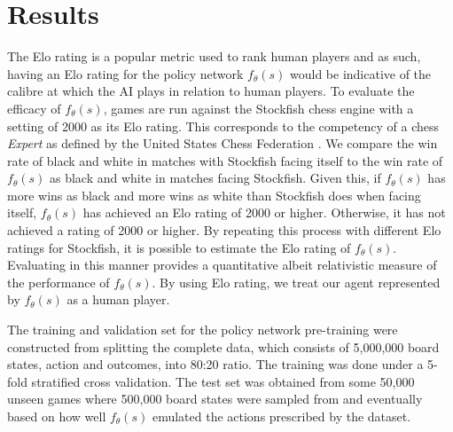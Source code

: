 \documentclass[letterpaper]{article} %
\begin{document}
\section{Results}

%
%
%
%

The Elo rating is a popular metric used to rank human players and as such, having an Elo rating for the policy network $f_\theta(s)$ would be indicative of the calibre at which the AI plays in relation to human players. To evaluate the efficacy of $f_\theta(s)$, games are run against the Stockfish chess engine with a setting of 2000 as its Elo rating. This corresponds to the competency of a chess \textit{Expert} as defined by the United States Chess Federation \cite{just2003united}. We compare the win rate of black and white in matches with Stockfish facing itself to the win rate of $f_\theta(s)$ as black and white in matches facing Stockfish. Given this, if $f_\theta(s)$ has more wins as black and more wins as white than Stockfish does when facing itself, $f_\theta(s)$ has achieved an Elo rating of 2000 or higher. Otherwise, it has not achieved a rating of 2000 or higher. By repeating this process with different Elo ratings for Stockfish, it is possible to estimate the Elo rating of $f_\theta(s)$. Evaluating in this manner provides a quantitative albeit relativistic measure of the performance of $f_\theta(s)$. By using Elo rating, we treat our agent represented by $f_\theta(s)$ as a human player.


The training and validation set for the policy network pre-training were constructed from splitting the complete data, which consists of 5,000,000 board states, action and outcomes, into 80:20 ratio. The training was done under a 5-fold stratified cross validation. The test set was obtained from some 50,000 unseen games where 500,000 board states were sampled from and eventually based on how well $f_\theta(s)$ emulated the actions prescribed by the dataset.
\end{document}
